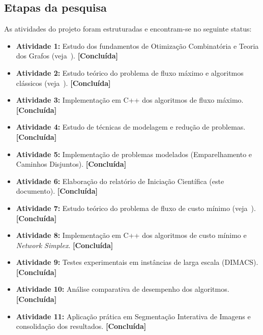 \documentclass[12pt,a4paper]{article}
\begin{document}
\subsection{Etapas da pesquisa}
As atividades do projeto foram estruturadas e encontram-se no seguinte status:
\begin{itemize}[leftmargin=1.5em, itemsep=0.1em, topsep=0.15em, parsep=0em]
    \item \textbf{Atividade 1:} Estudo dos fundamentos de Otimização Combinatória e Teoria dos Grafos (veja~\cite{cook1998combinatorial}). \textbf{[Concluída]}
    \item \textbf{Atividade 2:} Estudo teórico do problema de fluxo máximo e algoritmos clássicos (veja~\cite{ford1956maximal, edmonds1972theoretical, dinic1970algorithm, goldberg1988new}). \textbf{[Concluída]}
    \item \textbf{Atividade 3:} Implementação em C++ dos algoritmos de fluxo máximo. \textbf{[Concluída]}
    \item \textbf{Atividade 4:} Estudo de técnicas de modelagem e redução de problemas. \textbf{[Concluída]}
    \item \textbf{Atividade 5:} Implementação de problemas modelados (Emparelhamento e Caminhos Disjuntos). \textbf{[Concluída]}
    \item \textbf{Atividade 6:} Elaboração do relatório de Iniciação Científica (este documento). \textbf{[Concluída]}
    \item \textbf{Atividade 7:} Estudo teórico do problema de fluxo de custo mínimo (veja~\cite{ahuja1993network}). \textbf{[Concluída]}
    \item \textbf{Atividade 8:} Implementação em C++ dos algoritmos de custo mínimo e \textit{Network Simplex}. \textbf{[Concluída]}
    \item \textbf{Atividade 9:} Testes experimentais em instâncias de larga escala (DIMACS). \textbf{[Concluída]}
    \item \textbf{Atividade 10:} Análise comparativa de desempenho dos algoritmos. \textbf{[Concluída]}
    \item \textbf{Atividade 11:} Aplicação prática em Segmentação Interativa de Imagens e consolidação dos resultados. \textbf{[Concluída]}
\end{itemize}

\clearpage

\end{document}
